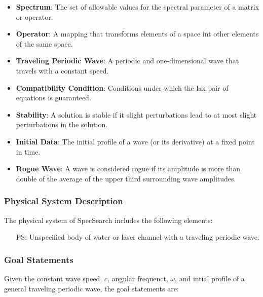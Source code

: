 \documentclass[12pt]{article}
\newcounter{goalnum} %
\begin{document}
\begin{itemize}

\item \textbf{Spectrum}: The set of allowable values for the spectral parameter 
of a matrix or operator.
\item \textbf{Operator}: A mapping that transforms elements of a space int 
other elements of the same space. 
\item \textbf{Traveling Periodic Wave}: A periodic and one-dimensional wave 
that travels with a constant speed. 
\item \textbf{Compatibility Condition}: Conditions under which the lax pair of 
equations is guaranteed. 
\item \textbf{Stability}: A solution is stable if it slight perturbations lead 
to at most slight perturbations in the solution.
\item \textbf{Initial Data}: The initial profile of a wave (or its derivative) 
at a fixed point in time.
\item \textbf{Rogue Wave}: A wave is considered rogue if its amplitude is more 
than double of the average of the upper third surrounding wave amplitudes.

\end{itemize}

\subsubsection{Physical System Description}

The physical system of SpecSearch includes the following elements:

\begin{itemize}

\item[PS\refstepcounter{goalnum}\thegoalnum \label{G_meaningfulLabel}:] 
Unspecified body of water or laser channel with a traveling periodic 
wave.

\end{itemize}

\subsubsection{Goal Statements}
\noindent Given the constant wave speed, $c$, angular frequenct, $\omega$, and 
intial profile of a general traveling periodic wave, the goal statements are:
\end{document}
